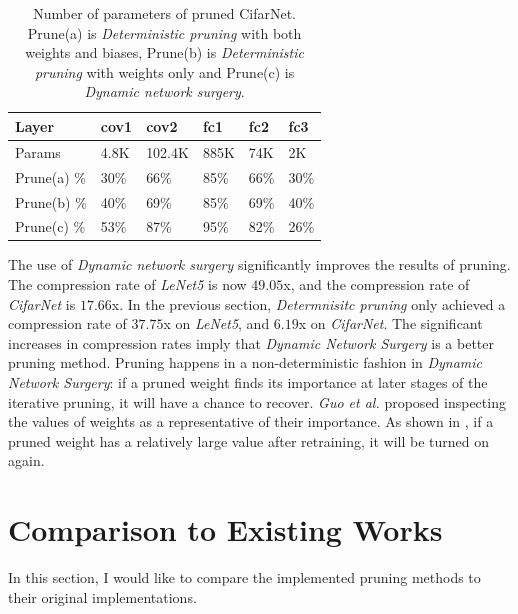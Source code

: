 \documentclass[a4paper,12pt]{report}
\begin{document}
\begin{table}[!h]
\centering
\begin{tabular}{|l|l|l|l|l|l|}
\hline
Layer			&cov1	&cov2		&fc1		&fc2		&fc3		\\ \hline
Params		& 4.8K		&102.4K	&885K	&74K		&2K 	\\
\hline
Prune(a) \%	& 30\%		&66\%	&85\%	&66\%	&30\%	 \\
\hline
Prune(b) \%	& 40\%		&69\%	&85\%	&69\%	&40\% \\
\hline
Prune(c) \%	& 53\%		&87\%	&95\%	&82\%	&26\% \\
\hline
\end{tabular}
\caption{Number of parameters of pruned CifarNet.
Prune(a) is \textit{Deterministic pruning} with both weights and biases,
Prune(b) is \textit{Deterministic pruning} with weights only and
Prune(c) is \textit{Dynamic network surgery}.}
\label{tab:CifarNetPrune3}
\end{table}

The use of \textit{Dynamic network surgery} significantly improves the results of
pruning.
The compression rate of \textit{LeNet5} is now $49.05$x, and the compression
rate of \textit{CifarNet} is $17.66$x.
In the previous section, \textit{Determnisitc pruning} only achieved
a compression rate of $37.75$x on \textit{LeNet5}, and $6.19$x on \textit{CifarNet}.
The significant increases in compression rates imply that \textit{Dynamic Network
Surgery} is a better pruning method.
Pruning happens in a non-deterministic fashion in \textit{Dynamic Network
Surgery}: if a pruned weight finds its importance at later stages of the
iterative pruning, it will have a chance to recover.
\textit{Guo et al.} proposed inspecting the values of weights as a representative
of their importance.
As shown in , if a pruned weight has a relatively large value
after retraining, it will be turned on again.

\section{Comparison to Existing Works}
\label{sec:pruning_ext_comp}
In this section, I would like to compare the implemented pruning methods to
their original implementations.
\end{document}

